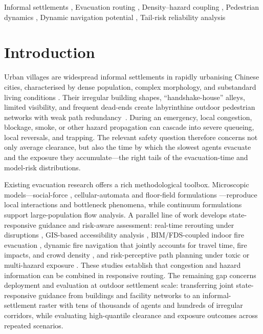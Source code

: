 \documentclass[preprint,12pt]{elsarticle}
\providecommand{\FloatBarrier}{}
\let\origsection\section
\renewcommand{\section}{\FloatBarrier\origsection}
\begin{document}
\begin{frontmatter}
\begin{keyword}
Informal settlements \sep
Evacuation routing \sep
Density--hazard coupling \sep
Pedestrian dynamics \sep
Dynamic navigation potential \sep
Tail-risk reliability analysis
\end{keyword}
\end{frontmatter}


\section{Introduction}
\label{sec:intro}

Urban villages are widespread informal settlements in rapidly
urbanising Chinese cities, characterised by dense population, complex morphology, and substandard living conditions \citep{cao2025mapping}. Their irregular building
shapes, ``handshake-house'' alleys, limited visibility, and frequent
dead-ends create labyrinthine outdoor pedestrian networks with weak path
redundancy~\citep{Al2014Villages_UHPress,Lin2011GuangzhouVIC}. During an
emergency, local congestion, blockage, smoke, or other hazard propagation
can cascade into severe queueing, local reversals, and trapping. The relevant
safety question therefore concerns not only average clearance, but also the
time by which the slowest agents evacuate and the exposure they
accumulate---the right tails of the evacuation-time and model-risk
distributions.

Existing evacuation research offers a rich methodological toolbox.
Microscopic models---social-force \citep{Helbing1995SocialForce},
cellular-automata and floor-field formulations
\citep{BlueAdler2001CA,Burstedde2001FloorField}---reproduce local
interactions and bottleneck phenomena, while continuum formulations
\citep{Hughes2002Continuum} support large-population flow analysis. A
parallel line of work develops state-responsive guidance and risk-aware
assessment: real-time rerouting under disruptions
\citep{Darvishan2021DynamicReroute}, GIS-based accessibility analysis
\citep{Liu2022EvacAccessibility}, BIM/FDS-coupled indoor fire evacuation
\citep{Ding2024BIMFireEvac}, dynamic fire navigation that jointly accounts for
travel time, fire impacts, and crowd density
\citep{Golshani2025FireNavigation}, and risk-perceptive path planning under
toxic or multi-hazard exposure
\citep{He2024RiskPerceptionPath,Luan2025ToxicGasAirport}. These studies establish
that congestion and hazard information can be combined in responsive routing.
The remaining gap concerns deployment and evaluation at outdoor settlement
scale: transferring joint state-responsive guidance from buildings and
facility networks to an informal-settlement raster with tens of thousands of
agents and hundreds of irregular corridors, while evaluating high-quantile
clearance and exposure outcomes across repeated scenarios.
\end{document}
